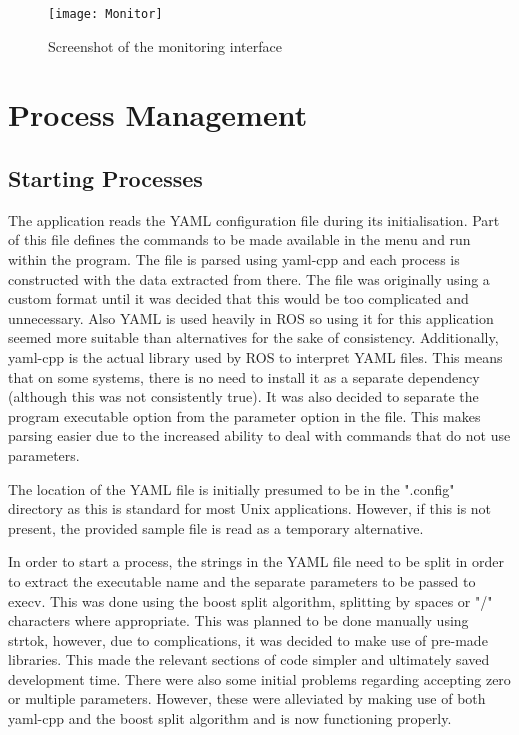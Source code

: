 \begin{figure}[h!]
  \centering
  \texttt{[image: Monitor]}
  \caption{Screenshot of the monitoring interface}
  \label{fig:monitor}
\end{figure}

\section{Process Management}
\label{process_management}

\subsection{Starting Processes}
\label{starting_processes}

The application reads the {\selectfont YAML} configuration file during its initialisation. Part of this file defines the commands to be made available in the menu and run within the program. The file is parsed using {\selectfont yaml-cpp}\cite{yaml-cpp} and each process is constructed with the data extracted from there. The file was originally using a custom format until it was decided that this would be too complicated and unnecessary. Also {\selectfont YAML} is used heavily in {\selectfont ROS} so using it for this application seemed more suitable than alternatives for the sake of consistency. Additionally, {\selectfont yaml-cpp} is the actual library used by {\selectfont ROS} to interpret {\selectfont YAML} files. This means that on some systems, there is no need to install it as a separate dependency (although this was not consistently true). It was also decided to separate the program executable option from the parameter option in the file. This makes parsing easier due to the increased ability to deal with commands that do not use parameters.

The location of the {\selectfont YAML} file is initially presumed to be in the ".config" directory as this is standard for most Unix applications. However, if this is not present, the provided sample file is read as a temporary alternative.

In order to start a process, the strings in the {\selectfont YAML} file need to be split in order to extract the executable name and the separate parameters to be passed to {\selectfont execv}\cite{exec}. This was done using the {\selectfont boost}\cite{boost} split algorithm, splitting by spaces or "/" characters where appropriate. This was planned to be done manually using {\selectfont strtok}, however, due to complications, it was decided to make use of pre-made libraries. This made the relevant sections of code simpler and ultimately saved development time. There were also some initial problems regarding accepting zero or multiple parameters. However, these were alleviated by making use of both {\selectfont yaml-cpp} and the {\selectfont boost} split algorithm and is now functioning properly.

